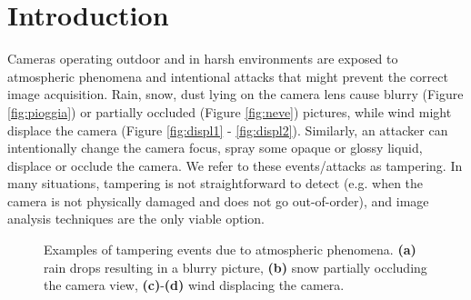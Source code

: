 \documentclass{llncs}
\begin{document}
\section{Introduction}\label{sec:introduction}
Cameras operating outdoor and in harsh environments are exposed to atmospheric phenomena and intentional attacks that might prevent the correct image acquisition. Rain, snow, dust lying on the camera lens cause blurry (Figure \ref{fig:pioggia}) or partially occluded (Figure \ref{fig:neve}) pictures, while wind might displace the camera (Figure \ref{fig:displ1} - \ref{fig:displ2}). Similarly, an attacker can intentionally change the camera focus, spray some opaque or glossy liquid, displace or occlude the camera. We refer to these events/attacks as tampering. In many situations, tampering is not straightforward to detect (e.g. when the camera is not physically damaged and does not go out-of-order), and image analysis techniques are the only viable option.

\begin{figure}[t!]
\centering
{}
\caption{Examples of tampering events due to atmospheric phenomena. \textbf{(a)} rain drops resulting in a blurry picture, \textbf{(b)} snow partially occluding the camera view, \textbf{(c)}-\textbf{(d)} wind displacing the camera.}
\label{fig:tampering}
\end{figure}
\end{document}
